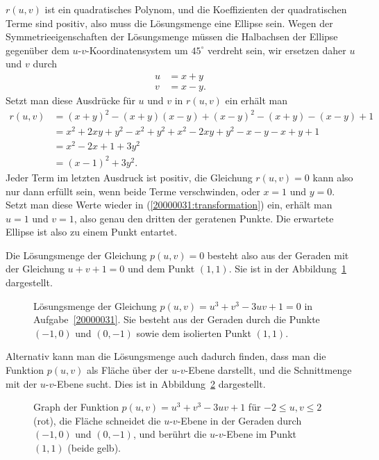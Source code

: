 \begin{diskussion}
$r(u,v)$ ist ein quadratisches Polynom, und die Koeffizienten der quadratischen
Terme sind positiv, also muss die Lösungsmenge eine Ellipse sein.
Wegen der Symmetrieeigenschaften der Lösungsmenge müssen die Halbachsen der 
Ellipse gegenüber dem $u$-$v$-Koordinatensystem um $45^\circ$ verdreht sein,
wir ersetzen daher $u$ und $v$ durch
\begin{equation}
\begin{aligned}
u&=x+y
\\
v&=x-y.
\end{aligned}
\label{20000031:transformation}
\end{equation}
Setzt man diese Ausdrücke für $u$ und $v$ in $r(u,v)$ ein erhält man
\begin{align*}
r(u,v)
&=(x+y)^2-(x+y)(x-y)+(x-y)^2-(x+y)-(x-y)+1\\
&=x^2+2xy+y^2-x^2+y^2+x^2-2xy+y^2-x-y-x+y+1\\
&=x^2-2x+1+3y^2\\
&=(x-1)^2+3y^2.
\end{align*}
Jeder Term im letzten Ausdruck ist positiv, die Gleichung $r(u,v)=0$ kann
also nur dann erfüllt sein, wenn beide Terme verschwinden, oder $x=1$ und $y=0$.
Setzt man diese Werte wieder in (\ref{20000031:transformation}) ein,
erhält man $u=1$ und $v=1$, also genau den dritten der geratenen Punkte.
Die erwartete Ellipse ist also zu einem Punkt entartet.

Die Lösungsmenge der Gleichung $p(u,v)=0$ besteht also aus der Geraden
mit der Gleichung $u+v+1=0$ und dem Punkt $(1,1)$.
Sie ist in der Abbildung~\ref{20000031:loesungsmenge} dargestellt.
\begin{figure}
\centering
{}
\caption{Lösungsmenge der Gleichung $p(u,v) = u^3+v^3-3uv+1=0$
in Aufgabe~\ref{20000031}. Sie besteht aus der Geraden durch die
Punkte $(-1,0)$ und $(0,-1)$ sowie dem isolierten Punkt $(1,1)$.
\label{20000031:loesungsmenge}}
\end{figure}

Alternativ kann man die Lösungsmenge auch dadurch finden, dass man die
Funktion $p(u,v)$ als Fläche über der $u$-$v$-Ebene darstellt, und die
Schnittmenge mit der $u$-$v$-Ebene sucht.
Dies  ist in Abbildung~\ref{20000031:flaeche} dargestellt.
\begin{figure}
\centering
{}
\caption{Graph der Funktion $p(u,v)=u^3+v^3-3uv+1$ für $-2\le u,v\le 2$ (rot),
die Fläche schneidet die $u$-$v$-Ebene in der Geraden durch $(-1,0)$ und
$(0,-1)$, und berührt die $u$-$v$-Ebene im Punkt $(1,1)$ (beide gelb).
\label{20000031:flaeche}}
\end{figure}
\end{diskussion}

